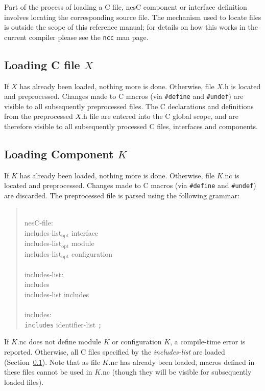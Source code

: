 \documentclass[11pt,letterpaper]{article}
\newcommand{\kw}[1]{{\tt #1}}
\newcommand{\code}[1]{{\tt #1}}
\newcommand{\file}[1]{{\tt #1}}
\newcommand{\nesc}{nesC\xspace}
\newcommand{\opt}{$_{\mbox{opt}}$\xspace}
\newcommand{\grammarshift}{\vspace*{-.7cm}}
\newcommand{\grammarindent}{\hspace*{2cm}\= \\ \kill}
\begin{document}
Part of the process of loading a C file, \nesc component or interface
definition involves locating the corresponding source file. The mechanism
used to locate files is outside the scope of this reference manual; for
details on how this works in the current compiler please see the \file{ncc}
man page.

\subsection{Loading C file $X$}
\label{sec:load-c}

If $X$ has already been loaded, nothing more is done. Otherwise, file $X$.h
is located and preprocessed. Changes made to C macros (via \code{\#define}
and \code{\#undef}) are visible to all subsequently preprocessed files. The C
declarations and definitions from the preprocessed $X$.h file are entered
into the C global scope, and are therefore visible to all subsequently
processed C files, interfaces and components.

\subsection{Loading Component $K$}
\label{sec:load-component}

If $K$ has already been loaded, nothing more is done. Otherwise, file
$K$.nc is located and preprocessed. Changes made to C macros (via
\code{\#define} and \code{\#undef}) are discarded. The preprocessed file is
parsed using the following grammar: \begin{quote} \grammarshift \em \begin{tabbing}
\grammarindent
nesC-file: \\
\>	includes-list\opt interface\\
\>	includes-list\opt module\\
\>	includes-list\opt configuration\\
\\
includes-list:\\
\>	includes\\
\>	includes-list includes\\
\\
includes:\\
\>	\kw{includes} identifier-list \kw{;}\\
\end{tabbing} \end{quote}
If $K$.nc does not define module $K$ or configuration $K$, a
compile-time error is reported. Otherwise, all C files specified by the
\emph{includes-list} are loaded (Section~\ref{sec:load-c}). Note that
as file $K$.nc has already been loaded, macros defined in these files cannot
be used in $K$.nc (though they will be visible for subsequently loaded files).
\end{document}
